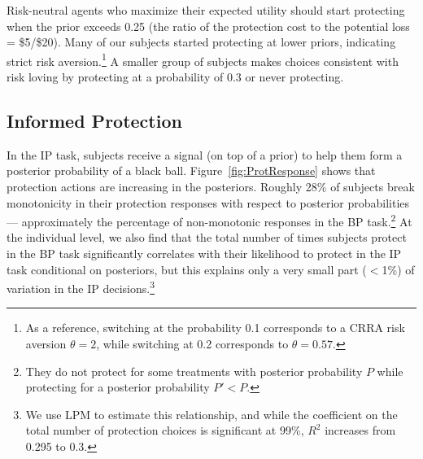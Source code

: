 \documentclass[12pt,a4paper]{article}
\begin{document}
Risk-neutral agents who maximize their expected utility should start protecting when the prior exceeds 0.25 (the ratio of the protection cost to the potential loss = \$5/\$20). Many of our subjects started protecting at lower priors, indicating strict risk aversion.\footnote{As a reference, switching at the probability 0.1 corresponds to a CRRA risk aversion $\theta=2$, while switching at 0.2 corresponds to $\theta=0.57$.}  A smaller group of subjects makes choices consistent with risk loving by protecting at a probability of 0.3 or never protecting. 

\subsection{Informed Protection}

In the IP task, subjects receive a signal (on top of a prior) to help them form a posterior probability of a black ball. 
Figure~\ref{fig:ProtResponse} shows that protection actions are increasing in the posteriors. Roughly 28\% of subjects break monotonicity in their protection responses with respect to posterior probabilities --- approximately the percentage of non-monotonic responses in the BP task.\footnote{ They do not protect for some treatments with posterior probability $P$ while protecting for a posterior probability $P'<P$.}  At the individual level, we also find that the total number of times subjects protect in the BP task significantly correlates with their likelihood to protect in the IP task conditional on posteriors, but this explains only a very small part ($<$1\%) of variation in the IP decisions.\footnote{We use LPM to estimate this relationship, and while the coefficient on the total number of protection choices is significant at 99\%, $R^2$ increases from 0.295 to 0.3.} 


\end{document}
